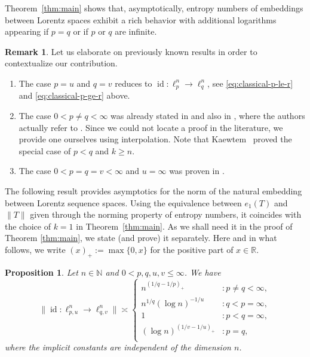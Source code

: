 \documentclass[a4paper,12pt]{article}
\newtheorem{prop}[thm]{Proposition}
\theoremstyle{definition}
\newtheorem{remark}{Remark}
\newcommand{\N}{\mathbb{N}}
\newcommand{\IR}{\mathbb{R}}
\DeclareMathOperator{\id}{id}
\begin{document}
Theorem~\ref{thm:main} shows that, asymptotically, entropy numbers of embeddings between Lorentz spaces exhibit a rich behavior with additional logarithms appearing if $p=q$ or if $p$ or $q$ are infinite.

\begin{remark}\phantom{}
Let us elaborate on previously known results in order to contextualize our contribution.   

\begin{enumerate}
	\item The case $p=u$ and $q=v$ reduces to $\id\colon \ell_p^n\to \ell_q^n$, see \eqref{eq:classical-p-le-r} and \eqref{eq:classical-p-ge-r} above.
	\item The case $0<p\neq q<\infty$ was already stated in \cite[Eq. (29)]{DV20} and also in \cite{EN11}, where the authors actually refer to \cite{EN98}. Since we could not locate a proof in the literature, we provide one ourselves using interpolation. Note that Kaewtem~\cite[Corollary 4.3]{Kae17} proved the special case of $p<q$ and $k\ge n$.%
	\item The case $0<p=q=v< \infty$ and $u=\infty$ was proven in \cite[Theorem 10]{DV20}.
\end{enumerate}
\end{remark} 

The following result provides asymptotics for the norm of the natural embedding between Lorentz sequence spaces.  
Using the equivalence between $e_1(T)$ and $\|T\|$ given through the norming property of entropy numbers, it coincides with the choice of $k=1$ in Theorem~\ref{thm:main}.
As we shall need it in the proof of Theorem \ref{thm:main}, we state (and prove) it separately.
Here and in what follows, we write $(x)_+:=\max\{0,x\}$ for the positive part of $x\in\IR$.

\begin{prop}\label{pro:norm-emb}
Let $n\in\N$ and $0<p,q,u,v\le \infty$. We have 
\[
\|\id\colon \ell_{p,u}^n\to \ell_{q,v}^n\|
\asymp 
\begin{cases}
n^{(1/q-1/p)_+}&\colon p\neq q<\infty,\\
n^{1/q}(\log n)^{-1/u}&\colon q<p=\infty,\\
1&\colon p<q=\infty,\\
(\log n)^{(1/v-1/u)_+}&\colon p=q,\\
\end{cases}
\]
where the implicit constants are independent of the dimension $n$.
\end{prop}
\end{document}
